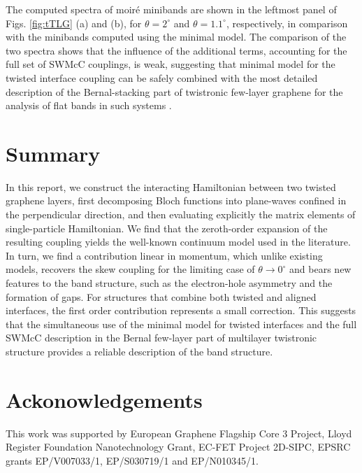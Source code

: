 \documentclass[showpacs,aps,prb,reprint,twocolumn]{revtex4-1}
\begin{document}
The computed spectra of moir\'{e} minibands are shown in the leftmost panel of Figs. \ref{fig:tTLG} (a) and (b), for $\theta=2^\circ$ and $\theta=1.1^\circ$, respectively, in comparison with the minibands computed using the minimal model. The comparison of the two spectra shows that the influence of the additional terms, accounting for the full set of SWMcC couplings, is weak, suggesting that minimal model for the twisted interface coupling can be safely combined with the most detailed description of the Bernal-stacking part of twistronic few-layer graphene for the analysis of flat bands in such systems \cite{Polshyn_2020,Shi_2020,Garcia-Ruiz_2020}.

\section{Summary}
\label{sec:sum}
In this report, we construct the interacting Hamiltonian between two twisted graphene layers, first decomposing Bloch functions into plane-waves confined in the perpendicular direction, and then evaluating explicitly the matrix elements of single-particle Hamiltonian. We find that the zeroth-order expansion of the resulting coupling yields the well-known continuum model used in the literature. In turn, we find a contribution linear in momentum, which unlike existing models, recovers the skew coupling for the limiting case of $\theta\to0^\circ$ and bears new features to the band structure, such as the electron-hole asymmetry and the formation of gaps. For structures that combine both twisted and aligned interfaces, the first order contribution represents a small correction. This suggests that the simultaneous use of the minimal model for twisted interfaces and the full SWMcC description in the Bernal few-layer part of multilayer twistronic structure provides a reliable description of the band structure.
\section{Ackonowledgements}
This work was supported by European Graphene Flagship Core 3 Project, Lloyd Register Foundation Nanotechnology Grant, EC-FET Project 2D-SIPC, EPSRC grants EP/V007033/1, EP/S030719/1 and EP/N010345/1.

\newpage
\end{document}
